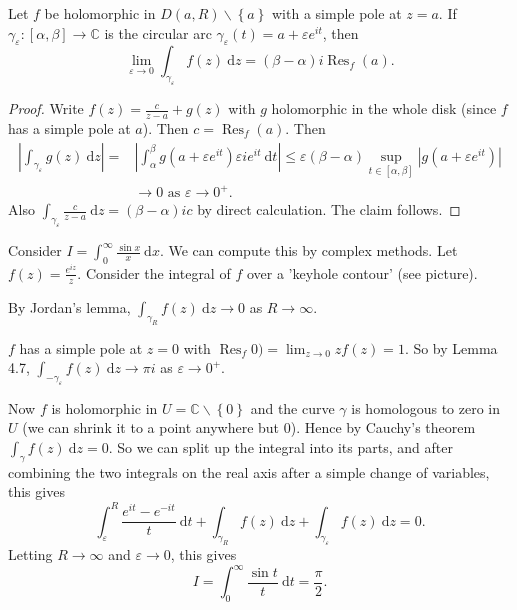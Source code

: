 \documentclass[egregdoesnotlikesansseriftitles,a4paper]{scrartcl}
\begin{document}
\begin{lemma}
      Let $f$ be holomorphic in $D (a,R)\backslash \left\{a\right\}$ with a simple pole at $z=a$. If $\gamma_{\varepsilon}: [\alpha,\beta] \rightarrow \mathbb{C}$ is the circular arc $\gamma_{\varepsilon}(t)=a+ \varepsilon e^{it}$, then \[
      \lim_{\varepsilon \rightarrow 0} \int_{\gamma_{\varepsilon}}^{} f (z) \ \mathrm{d}z = (\beta- \alpha)i \operatorname{Res}_{f} (a)
      .\] 
      \begin{proof}
            Write $f (z)=\frac{c}{z-a}+g (z)$ with $g$ holomorphic in the whole disk (since $f$ has a simple pole at $a$). Then $c= \operatorname{Res}_{f}(a)$. Then 
            \begin{align*}
                 \left|\int_{\gamma_{\varepsilon}}^{} g (z) \ \mathrm{d}z \right|=& \left|\int_{\alpha}^{\beta}g (a+ \varepsilon e^{it })\varepsilon i e^{it} \ \mathrm{d}t \right|\leq \varepsilon (\beta-\alpha)\sup_{t \in [\alpha, \beta]} \left|g (a +\varepsilon e^{it})\right|\\
                 & \rightarrow 0 \text{ as  } \varepsilon \rightarrow 0^{+}.
            \end{align*}
            Also $\int_{\gamma_{\varepsilon}}^{} \frac{c}{z-a} \ \mathrm{d}z = (\beta-\alpha)ic  $ by direct calculation. The claim follows.
      \end{proof}
\end{lemma}
\begin{example*}
      Consider $I = \int_{0}^{\infty} \frac{\sin x}{x} \ \mathrm{d} x$. We can compute this by complex methods. Let $f (z)= \frac{e^{iz}}{z}$. Consider the integral of $f$ over a 'keyhole contour' (see picture).

      By Jordan's lemma, $\int_{\gamma_{R}}^{}f (z) \ \mathrm{d}z \rightarrow 0  $ as $R \rightarrow \infty$.

      $f$ has a simple pole at $z=0$ with $\operatorname{Res }_{f}0) =\lim_{z \rightarrow 0}z f (z)=1$. So by Lemma 4.7, $\int_{-\gamma_{\varepsilon}}^{}f (z) \ \mathrm{d}z \rightarrow  \pi i $ as $\varepsilon \rightarrow 0^{+}$. 
      
      Now $f$ is holomorphic in $U = \mathbb{C} \backslash \left\{0\right\}$ and the curve $\gamma$ is homologous to zero in $U$ (we can shrink it to a point anywhere but 0). Hence by Cauchy's theorem $\int_{\gamma}^{}f (z) \ \mathrm{d}z =0 $. So we can split up the integral into its parts, and after combining the two integrals on the real axis after a simple change of variables, this gives \[
      \int_{\varepsilon}^{R} \frac{e^{it}- e^{-it}}{t} \ \mathrm{d} t + \int_{\gamma_{R}}^{}f (z) \ \mathrm{d}z + \int_{\gamma_{\varepsilon}}^{} f (z) \ \mathrm{d}z =0 
      .\] Letting $R \rightarrow \infty$ and $\varepsilon \rightarrow 0$, this gives \[
      I=\int_{0}^{\infty} \frac{\sin t}{t} \ \mathrm{d}t = \frac{\pi}{2} 
      .\] 
\end{example*}
\end{document}
